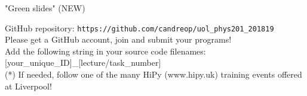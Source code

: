 \begin{frame}{"Green slides" (NEW)}
\vspace{0.2cm}

\begin{center}
{\scriptsize
  GitHub repository:
  {\color{blue} {\tt https://github.com/candreop/uol\_phys201\_201819}}\\
  {\scriptsize
    Please get a GitHub account, join and submit your programs!\\
    Add the following string in your source code filenames: {\color{red}[your\_unique\_ID]\_[lecture/task\_number]}\\
  }
}
{\scriptsize
  (*) If needed, follow one of the many HiPy (www.hipy.uk) training events offered at Liverpool!
}
\end{center}

\end{frame}

%
%
%

